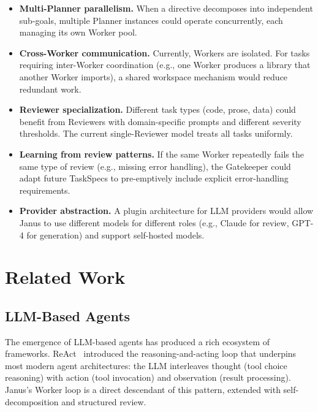 \documentclass[11pt,a4paper]{article}
\begin{document}
\begin{itemize}[leftmargin=*,itemsep=2pt]
    \item \textbf{Multi-Planner parallelism.} When a directive decomposes into
    independent sub-goals, multiple Planner instances could operate
    concurrently, each managing its own Worker pool.

    \item \textbf{Cross-Worker communication.} Currently, Workers are isolated.
    For tasks requiring inter-Worker coordination (e.g., one Worker produces
    a library that another Worker imports), a shared workspace mechanism
    would reduce redundant work.

    \item \textbf{Reviewer specialization.} Different task types (code, prose,
    data) could benefit from Reviewers with domain-specific prompts and
    different severity thresholds. The current single-Reviewer model treats
    all tasks uniformly.

    \item \textbf{Learning from review patterns.} If the same Worker
    repeatedly fails the same type of review (e.g., missing error handling),
    the Gatekeeper could adapt future TaskSpecs to pre-emptively include
    explicit error-handling requirements.

    \item \textbf{Provider abstraction.} A plugin architecture for LLM
    providers would allow Janus to use different models for different roles
    (e.g., Claude for review, GPT-4 for generation) and support
    self-hosted models.
\end{itemize}

\section{Related Work}

\subsection{LLM-Based Agents}

The emergence of LLM-based agents has produced a rich ecosystem of
frameworks. ReAct~\cite{react} introduced the reasoning-and-acting loop
that underpins most modern agent architectures: the LLM interleaves thought
(tool choice reasoning) with action (tool invocation) and observation
(result processing). Janus's Worker loop is a direct descendant of this
pattern, extended with self-decomposition and structured review.
\end{document}
